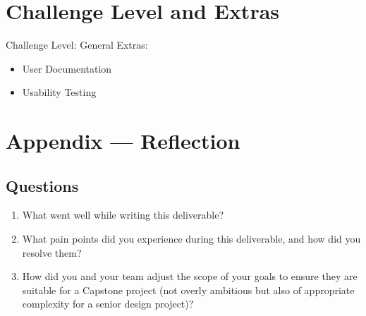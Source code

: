 \documentclass{article}
\begin{document}
\section{Challenge Level and Extras}

Challenge Level: General
Extras:
\begin{itemize}
\item User Documentation
\item Usability Testing
\end{itemize}

\newpage{}

\section*{Appendix --- Reflection}
\subsection*{Questions}
\begin{enumerate}
    \item What went well while writing this deliverable? 
    \item What pain points did you experience during this deliverable, and how
    did you resolve them?
    \item How did you and your team adjust the scope of your goals to ensure
    they are suitable for a Capstone project (not overly ambitious but also of
    appropriate complexity for a senior design project)?
\end{enumerate}  
\end{document}
